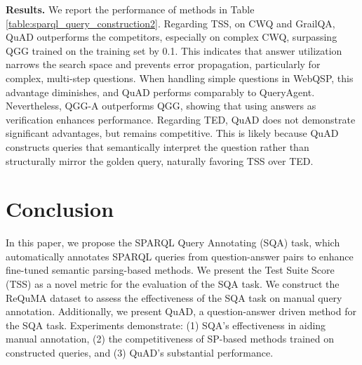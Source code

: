 \documentclass[runningheads]{llncs}
\begin{document}
\noindent \textbf{Results.}
We report the performance of methods in Table \ref{table:sparql_query_construction2}. Regarding TSS,
on CWQ and GrailQA, QuAD outperforms the competitors, especially on complex CWQ, surpassing QGG trained on the training set by 0.1.
This indicates that answer utilization narrows the search space and prevents error propagation, particularly for complex, multi-step questions. 
When handling simple questions in WebQSP, this advantage diminishes, and QuAD performs comparably to QueryAgent. Nevertheless, QGG-A outperforms QGG, showing that using answers as verification enhances performance.
Regarding TED, QuAD does not demonstrate significant advantages, but remains competitive.
This is likely because QuAD constructs queries that semantically interpret the question rather than structurally mirror the golden query, naturally favoring TSS over TED.




\section{Conclusion} \label{sec:conclusion}

In this paper, we propose the SPARQL Query Annotating (SQA) task, which automatically annotates SPARQL queries from question-answer pairs to enhance fine-tuned semantic parsing-based methods. 
We present the Test Suite Score (TSS) as a novel metric for the evaluation of the SQA task. 
We construct the ReQuMA dataset to assess the effectiveness of the SQA task on manual query annotation. Additionally, we present QuAD, a question-answer driven method for the SQA task.
Experiments demonstrate: (1) SQA’s effectiveness in aiding manual annotation, (2) the competitiveness of SP-based methods trained on constructed queries, and (3) QuAD’s substantial performance.
\end{document}
